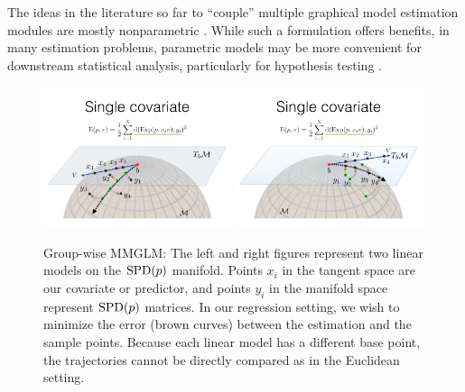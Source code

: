 The ideas in the literature so far to ``couple'' multiple graphical model estimation modules are mostly nonparametric \citep{zhou2010time, mcardle2000introduction,qiu2015joint}. 
While such a formulation offers benefits, in many estimation problems, 
parametric models may 
be more convenient for downstream statistical analysis,
particularly for hypothesis testing \citep{hardle1993comparing,geer2000empirical,roehrig1988conditions}.
\begin{figure}[t]
  \centering
  \includegraphics[width=0.49\textwidth,trim={10 40 10 220},clip]{chap2/MGLM1.png}
    \includegraphics[width=0.49\textwidth,trim={10 40 10 220},clip]{chap2/MGLM2.png}
  \caption{\small\label{fig:manifold}Group-wise MMGLM: The left and right figures represent two linear models on the $\text{SPD}(p)$ manifold. Points $x_i$ in the tangent space are our covariate or predictor, and points $y_i$ in the manifold space represent $\text{SPD}(p)$ matrices. In our regression setting, we wish to minimize the error (brown curves) between the estimation and the sample points. Because each linear model has a different base point, the trajectories cannot be directly compared as in the Euclidean setting.}
\end{figure}

